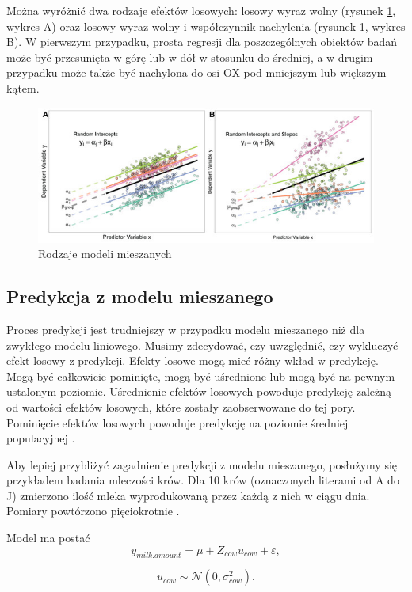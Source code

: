 \documentclass[12pt]{mwbk}
\theoremstyle{plain}
\theoremstyle{definition}
\theoremstyle{remark}
\newcommand\zrodlo[1]{\par\vspace{-3mm}{\small\textit{Źródło: }#1 }}
\begin{document}
Można wyróżnić dwa rodzaje efektów losowych: losowy wyraz wolny (rysunek \ref{fig:random_types}, wykres A) oraz losowy wyraz wolny i współczynnik nachylenia (rysunek \ref{fig:random_types}, wykres B). W pierwszym przypadku, prosta regresji dla poszczególnych obiektów badań może być przesunięta w górę lub w dół w stosunku do średniej, a w drugim przypadku może także być nachylona do osi OX pod mniejszym lub większym kątem.

\begin{figure}[htbp]
	\centering
	\includegraphics[width=\linewidth]{rys/random_types.jpg}
	\caption{Rodzaje modeli mieszanych}
	\label{fig:random_types}
	\zrodlo{\cite{brief}}
\end{figure}

\subsection{Predykcja z modelu mieszanego}
Proces predykcji jest trudniejszy w przypadku modelu mieszanego niż dla zwykłego modelu liniowego. Musimy zdecydować, czy uwzględnić, czy wykluczyć efekt losowy z predykcji. Efekty losowe mogą mieć różny wkład w predykcję. Mogą być całkowicie pominięte, mogą być uśrednione lub mogą być na pewnym ustalonym poziomie. Uśrednienie efektów losowych powoduje predykcję zależną od wartości efektów losowych, które zostały zaobserwowane do tej pory. Pominięcie efektów losowych powoduje predykcję na poziomie średniej populacyjnej
 \cite{prediction}.
 
 Aby lepiej przybliżyć zagadnienie predykcji z modelu mieszanego, posłużymy się przykładem badania mleczości krów. Dla 10 krów (oznaczonych literami od A do J) zmierzono ilość mleka wyprodukowaną przez każdą z nich w ciągu dnia. Pomiary powtórzono pięciokrotnie \cite{biecek}.
 
 Model ma postać 
 $$y_{milk.amount}=\mu+Z_{cow}u_{cow}+\varepsilon,$$

$$u_{cow} \sim \mathcal{N}(0, \sigma^2_{cow}).$$
 
\end{document}
